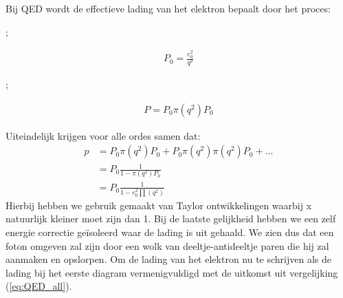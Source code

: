 \documentclass[../main.tex]{subfiles}
\begin{document}
Bij QED wordt de effectieve lading van het elektron bepaalt door het proces:\\
\begin{minipage}[c]{0.5\textwidth}
    \begin{center}
        ;
    \end{center}
    \begin{equation}
        \begin{aligned}
            \label{eq:QED_eerste_orde}
            P_0 = \frac{e_0^2}{q^2}
        \end{aligned}
    \end{equation}
\end{minipage}\noindent
\begin{minipage}[c]{0.5\textwidth}
    \begin{center}
        ;
    \end{center}
    \begin{equation}
        \begin{aligned}
            \label{eq:QED_tweede_orde}
            P = P_0\pi(q^2)P_0
        \end{aligned}
    \end{equation}
\end{minipage}
Uiteindelijk krijgen voor alle ordes samen dat:
\begin{equation}
    \begin{aligned}
        \label{eq:QED_all}
        p&=P_0\pi(q^2)P_0+P_0\pi(q^2)\pi(q^2)P_0+...\\
         &=P_0 \frac{1}{1-\pi(q^2)P_0} \\
         &=P_0 \frac{1}{1-e_0^2\prod(q^2)} 
    \end{aligned}
\end{equation}
Hierbij hebben we gebruik gemaakt van Taylor ontwikkelingen waarbij x natuurlijk kleiner moet zijn dan 1. Bij de laatste gelijkheid hebben we een zelf energie correctie geïsoleerd waar de lading is uit gehaald. We zien dus dat een foton omgeven zal zijn door een wolk van deeltje-antideeltje paren die hij zal aanmaken en opslorpen. Om de lading van het elektron nu te schrijven als de lading bij het eerste diagram vermenigvuldigd met de uitkomst uit vergelijking (\ref{eq:QED_all}).
\end{document}
